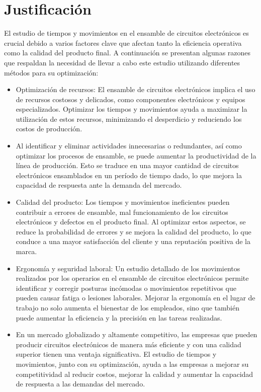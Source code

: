     \section{Justificación}

    El estudio de tiempos y movimientos en el ensamble de circuitos electrónicos es crucial debido a varios factores clave que afectan tanto la eficiencia operativa como la calidad del producto final. A continuación se presentan algunas razones que respaldan la necesidad de llevar a cabo este estudio utilizando diferentes métodos para su optimización:
    \begin{itemize}
        \item Optimización de recursos: El ensamble de circuitos electrónicos implica el uso de recursos costosos y delicados, como componentes electrónicos y equipos especializados. Optimizar los tiempos y movimientos ayuda a maximizar la utilización de estos recursos, minimizando el desperdicio y reduciendo los costos de producción.
        \item  Al identificar y eliminar actividades innecesarias o redundantes, así como optimizar los procesos de ensamble, se puede aumentar la productividad de la línea de producción. Esto se traduce en una mayor cantidad de circuitos electrónicos ensamblados en un período de tiempo dado, lo que mejora la capacidad de respuesta ante la demanda del mercado.
        \item Calidad del producto: Los tiempos y movimientos ineficientes pueden contribuir a errores de ensamble, mal funcionamiento de los circuitos electrónicos y defectos en el producto final. Al optimizar estos aspectos, se reduce la probabilidad de errores y se mejora la calidad del producto, lo que conduce a una mayor satisfacción del cliente y una reputación positiva de la marca.
        \item Ergonomía y seguridad laboral: Un estudio detallado de los movimientos realizados por los operarios en el ensamble de circuitos electrónicos permite identificar y corregir posturas incómodas o movimientos repetitivos que pueden causar fatiga o lesiones laborales. Mejorar la ergonomía en el lugar de trabajo no solo aumenta el bienestar de los empleados, sino que también puede aumentar la eficiencia y la precisión en las tareas realizadas.
        \item  En un mercado globalizado y altamente competitivo, las empresas que pueden producir circuitos electrónicos de manera más eficiente y con una calidad superior tienen una ventaja significativa. El estudio de tiempos y movimientos, junto con su optimización, ayuda a las empresas a mejorar su competitividad al reducir costos, mejorar la calidad y aumentar la capacidad de respuesta a las demandas del mercado.
    \end{itemize}

